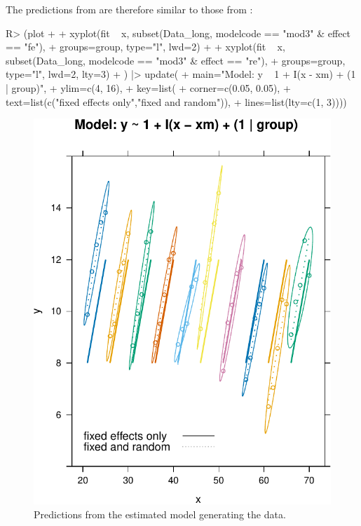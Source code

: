 \documentclass[
]{jss}
\begin{document}
The predictions from  are therefore similar to those from
:

\begin{CodeChunk}
\begin{CodeInput}
R> (plot +
+   xyplot(fit ~ x, subset(Data_long, modelcode == "mod3" & effect == "fe"),
+          groups=group, type="l", lwd=2) +
+   xyplot(fit ~ x, subset(Data_long, modelcode == "mod3" & effect == "re"),
+          groups=group, type="l", lwd=2, lty=3)
+ ) |> update(
+   main="Model: y ~ 1 + I(x - xm) + (1 | group)",
+   ylim=c(4, 16),
+   key=list(
+     corner=c(0.05, 0.05),
+     text=list(c("fixed effects only","fixed and random")),
+     lines=list(lty=c(1, 3))))
\end{CodeInput}
\begin{figure}

{\centering \includegraphics[width=1\linewidth]{JSS-article-reduced_files/figure-latex/plot-fits-mod3-1} 

}

\caption[Predictions from the estimated model generating the data]{Predictions from the estimated model generating the data.}\label{fig:plot-fits-mod3}
\end{figure}
\end{CodeChunk}
\end{document}
